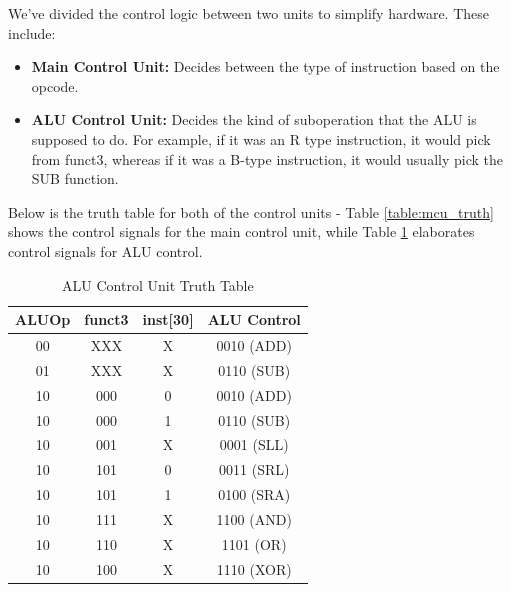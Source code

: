 \documentclass[journal]{IEEEtran}
\begin{document}
We've divided the control logic between two units to simplify hardware. These
include:
\begin{itemize}
  \item \textbf{Main Control Unit:} Decides between the type of instruction based on the opcode.
  \item \textbf{ALU Control Unit:} Decides the kind of suboperation that the ALU
        is supposed to do. For example, if it was an R type instruction, it would pick
        from funct3, whereas if it was a B-type instruction, it would usually pick the
        SUB function.
\end{itemize}

Below is the truth table for both of the control units - Table
\ref{table:mcu_truth} shows the control signals for the main control unit, while
Table \ref{table:alu_ctrl_truth} elaborates control signals for ALU control.

\begin{table}[!ht]
  \centering
  \caption{ALU Control Unit Truth Table}
  \begin{tabular}{|c|c|c|c|}
    \hline
    \textbf{ALUOp} & \textbf{funct3} & \textbf{inst[30]} & \textbf{ALU Control} \\
    \hline
    00             & XXX             & X                 & 0010 (ADD)           \\
    01             & XXX             & X                 & 0110 (SUB)           \\
    10             & 000             & 0                 & 0010 (ADD)           \\
    10             & 000             & 1                 & 0110 (SUB)           \\
    10             & 001             & X                 & 0001 (SLL)           \\
    10             & 101             & 0                 & 0011 (SRL)           \\
    10             & 101             & 1                 & 0100 (SRA)           \\
    10             & 111             & X                 & 1100 (AND)           \\
    10             & 110             & X                 & 1101 (OR)            \\
    10             & 100             & X                 & 1110 (XOR)           \\
    \hline
  \end{tabular}
  \label{table:alu_ctrl_truth}
\end{table}
\end{document}
